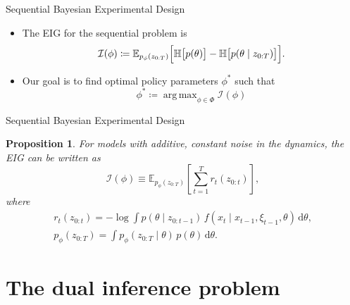 \documentclass[10pt, aspectratio=1610]{beamer}
\DeclareMathOperator*{\argmax}{arg\,max}
\newcommand{\dd}{\mathrm{d}}
\newtheorem{proposition}[theorem]{Proposition}
\begin{document}
    \begin{frame}{Sequential Bayesian Experimental Design}
      \begin{itemize}
        \item The EIG for the sequential problem is
          \begin{equation}
            \mathcal{I}(\phi) \coloneq \mathbb{E}_{p_{\phi}(z_{0:T})} \Bigl[ \mathbb{H}\bigl[p(\theta)\bigr] - \mathbb{H}\bigl[p(\theta \mid z_{0:T})\bigr] \Bigr].
          \end{equation}
        \item Our goal is to find optimal policy parameters $\phi^*$ such that
          \begin{equation}
            \phi^* \coloneq \argmax_{\phi \in \Phi} \mathcal{I}(\phi)
          \end{equation}
      \end{itemize}
    \end{frame}

    \begin{frame}{Sequential Bayesian Experimental Design}
      \begin{proposition}
        For models with additive, constant noise in the dynamics, the EIG can be written as
        \begin{equation}\label{eq:eig_constant_noise}
            \mathcal{I}(\phi) \equiv \mathbb{E}_{p_{\phi}(z_{0:T})} \left[ \sum_{t=1}^T r_{t}(z_{0:t}) \right],
        \end{equation}
        where
        \begin{gather}
          r_{t}(z_{0:t}) = - \log \int p(\theta \mid z_{0:t-1}) \, f(x_t \mid x_{t-1}, \xi_{t-1}, \theta) \, \dd \theta, \\
          p_\phi(z_{0:T}) = \int p_\phi(z_{0:T} \mid \theta) \, p(\theta) \, \dd \theta.
        \end{gather}
      \end{proposition}
    \end{frame}

  \section{The dual inference problem}
\end{document}
